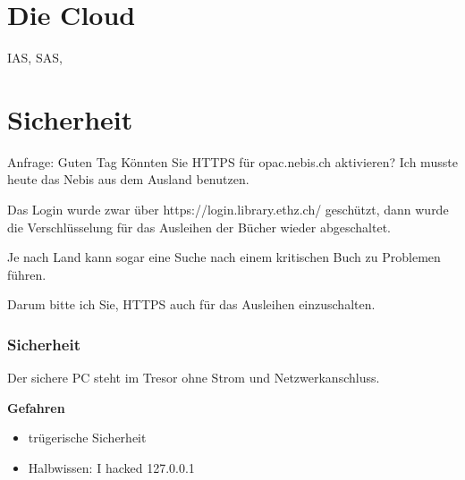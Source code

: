 \section{Die Cloud}
  IAS, SAS, 

\section{Sicherheit}
  Anfrage:
      Guten Tag
      Könnten Sie HTTPS für opac.nebis.ch aktivieren?
      Ich musste heute das Nebis aus dem Ausland benutzen.
  
      Das Login wurde zwar über https://login.library.ethz.ch/ geschützt, dann wurde die Verschlüsselung für das Ausleihen der Bücher wieder abgeschaltet.
  
      Je nach Land kann sogar eine Suche nach einem kritischen Buch zu Problemen führen.
  
      Darum bitte ich Sie, HTTPS auch für das Ausleihen einzuschalten.

		\begin{frame}
			\frametitle{Sicherheit}
			  \begin{theorem}
          Der sichere PC steht im Tresor ohne Strom und Netzwerkanschluss.
        \end{theorem}
        \textbf{Gefahren}
        \begin{itemize}
			     \item trügerische Sicherheit
			     \item Halbwissen: I hacked 127.0.0.1
        \end{itemize}
    \end{frame}

